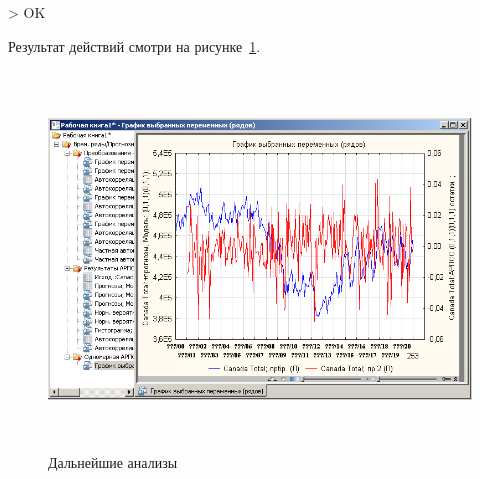 > OK

Результат действий смотри на рисунке~\ref{fig:2_23}.

\begin{figure}[!h]
  \centering

  \includegraphics[height=10cm]
  {inc/Canada_Gas_Production/23.PNG}

  \caption{Дальнейшие анализы}

  \label{fig:2_23}
\end{figure}
